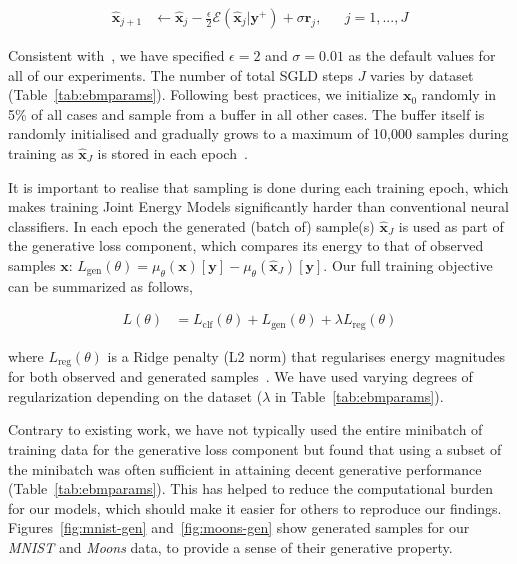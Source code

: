 \documentclass{article}
\begin{document}
\begin{equation}\label{eq:biased-sgld}
  \begin{aligned}
    \hat{\mathbf{x}}_{j+1} &\leftarrow \hat{\mathbf{x}}_j - \frac{\epsilon}{2} \mathcal{E}(\hat{\mathbf{x}}_j|\mathbf{y}^+) + \sigma \mathbf{r}_j, && j=1,...,J
  \end{aligned}
\end{equation}

Consistent with~\citet{grathwohl2020your}, we have specified $\epsilon=2$ and $\sigma=0.01$ as the default values for all of our experiments. The number of total SGLD steps $J$ varies by dataset (Table~\ref{tab:ebmparams}). Following best practices, we initialize $\mathbf{x}_0$ randomly in 5\% of all cases and sample from a buffer in all other cases. The buffer itself is randomly initialised and gradually grows to a maximum of 10,000 samples during training as $\hat{\mathbf{x}}_{J}$ is stored in each epoch~\citep{du2020implicit,grathwohl2020your}. 

It is important to realise that sampling is done during each training epoch, which makes training Joint Energy Models significantly harder than conventional neural classifiers. In each epoch the generated (batch of) sample(s) $\hat{\mathbf{x}}_{J}$ is used as part of the generative loss component, which compares its energy to that of observed samples $\mathbf{x}$: $L_{\text{gen}}(\theta)=\mu_{\theta}(\mathbf{x})[\mathbf{y}]-\mu_{\theta}(\hat{\mathbf{x}}_{J})[\mathbf{y}]$. Our full training objective can be summarized as follows,

\begin{equation}\label{eq:jem-loss}
  \begin{aligned}
    L(\theta) &= L_{\text{clf}}(\theta) + L_{\text{gen}}(\theta) + \lambda L_{\text{reg}}(\theta) 
  \end{aligned}
\end{equation}

where $L_{\text{reg}}(\theta)$ is a Ridge penalty (L2 norm) that regularises energy magnitudes for both observed and generated samples~\citep{du2020implicit}. We have used varying degrees of regularization depending on the dataset ($\lambda$ in Table~\ref{tab:ebmparams}). 

Contrary to existing work, we have not typically used the entire minibatch of training data for the generative loss component but found that using a subset of the minibatch was often sufficient in attaining decent generative performance (Table~\ref{tab:ebmparams}). This has helped to reduce the computational burden for our models, which should make it easier for others to reproduce our findings. Figures~\ref{fig:mnist-gen} and~\ref{fig:moons-gen} show generated samples for our \textit{MNIST} and \textit{Moons} data, to provide a sense of their generative property.
\end{document}
